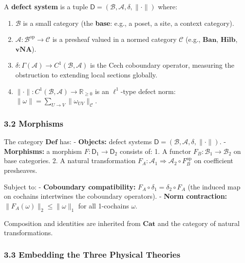 \documentclass[
]{article}
\providecommand{\tightlist}{%
  \setlength{\itemsep}{0pt}\setlength{\parskip}{0pt}}
\begin{document}
A \textbf{defect system} is a tuple
\(\mathsf{D} = (\mathcal{B}, \mathcal{A}, \delta, \|\cdot\|)\) where:

\begin{enumerate}
\def\labelenumi{\arabic{enumi}.}
\tightlist
\item
  \(\mathcal{B}\) is a small category (the \textbf{base}: e.g., a poset,
  a site, a context category).
\item
  \(\mathcal{A} : \mathcal{B}^{\mathrm{op}} \to \mathcal{C}\) is a
  presheaf valued in a normed category \(\mathcal{C}\) (e.g.,
  \(\mathbf{Ban}\), \(\mathbf{Hilb}\), \(\mathbf{vNA}\)).
\item
  \(\delta : \Gamma(\mathcal{A}) \to C^1(\mathcal{B}, \mathcal{A})\) is
  the Cech coboundary operator, measuring the obstruction to extending
  local sections globally.
\item
  \(\|\cdot\| : C^1(\mathcal{B}, \mathcal{A}) \to \mathbb{R}_{\geq 0}\)
  is an \(\ell^1\)-type defect norm:
  \(\|\omega\| = \sum_{U \to V} \|\omega_{UV}\|_{\mathcal{C}}\).
\end{enumerate}

\subsubsection{3.2 Morphisms}\label{morphisms}

The category \(\mathbf{Def}\) has: - \textbf{Objects:} defect systems
\(\mathsf{D} = (\mathcal{B}, \mathcal{A}, \delta, \|\cdot\|)\). -
\textbf{Morphisms:} a morphism \(F : \mathsf{D}_1 \to \mathsf{D}_2\)
consists of: 1. A functor \(F_B : \mathcal{B}_1 \to \mathcal{B}_2\) on
base categories. 2. A natural transformation
\(F_A : \mathcal{A}_1 \Rightarrow \mathcal{A}_2 \circ F_B^{\mathrm{op}}\)
on coefficient presheaves.

Subject to: - \textbf{Coboundary compatibility:}
\(F_A \circ \delta_1 = \delta_2 \circ F_A\) (the induced map on cochains
intertwines the coboundary operators). - \textbf{Norm contraction:}
\(\|F_A(\omega)\|_2 \leq \|\omega\|_1\) for all 1-cochains \(\omega\).

Composition and identities are inherited from \(\mathbf{Cat}\) and the
category of natural transformations.

\subsubsection{3.3 Embedding the Three Physical
Theories}\label{embedding-the-three-physical-theories}
\end{document}
